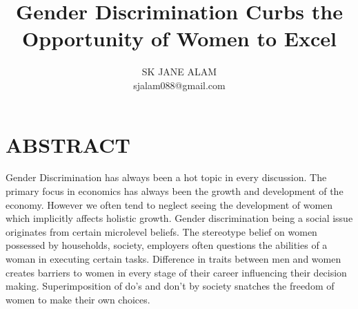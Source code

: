 \documentclass[12pt]{article}
\title{Gender Discrimination Curbs the Opportunity of Women to Excel}
\author{SK JANE ALAM\\sjalam088@gmail.com}
\date{}
\begin{document}
\maketitle
\section{ABSTRACT}
Gender Discrimination has always been a hot topic in every discussion. The primary focus in
economics has always been the growth and development of the economy. However we often
tend to neglect seeing the development of women which implicitly affects holistic growth.
Gender discrimination being a social issue originates from certain microlevel beliefs. The
stereotype belief on women possessed by households, society, employers often questions the
abilities of a woman in executing certain tasks. Difference in traits between men and women
creates barriers to women in every stage of their career influencing their decision making.
Superimposition of do’s and don’t by society snatches the freedom of women to make their
own choices.
\end{document}
